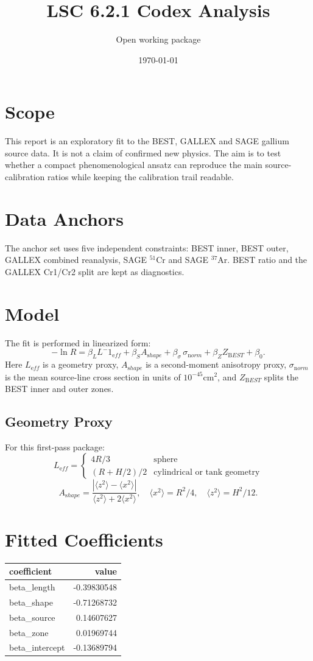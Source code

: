 \documentclass[11pt]{article}
\begin{document}
\title{LSC 6.2.1 Codex Analysis}
\author{Open working package}
\date{\today}
\maketitle

\section*{Scope}
This report is an exploratory fit to the BEST, GALLEX and SAGE gallium source data.
It is not a claim of confirmed new physics. The aim is to test whether a compact
phenomenological ansatz can reproduce the main source-calibration ratios while
keeping the calibration trail readable.

\section*{Data Anchors}
The anchor set uses five independent constraints:
BEST inner, BEST outer, GALLEX combined reanalysis, SAGE $^51$Cr and SAGE $^37$Ar.
BEST ratio and the GALLEX Cr1/Cr2 split are kept as diagnostics.

\section*{Model}
The fit is performed in linearized form:
\[
-\ln R = \beta_L L^-1_{\mathrm eff} + \beta_S A_{\mathrm shape} +
\beta_\sigma \, \sigma_{\mathrm norm} + \beta_Z Z_{\mathrm BEST} + \beta_0.
\]
Here $L_{\mathrm eff}$ is a geometry proxy, $A_{\mathrm shape}$ is a second-moment
anisotropy proxy, $\sigma_{\mathrm norm}$ is the mean source-line cross section in
units of $10^{-45}\mathrm{cm}^2$, and $Z_{\mathrm BEST}$ splits the BEST inner and
outer zones.

\subsection*{Geometry Proxy}
For this first-pass package:
\[
L_{\mathrm eff} =
\begin{cases}
4R/3 & \text{sphere} \\
(R + H/2)/2 & \text{cylindrical or tank geometry}
\end{cases}
\]
\[
A_{\mathrm shape} = \frac{\left| \langle z^2 \rangle - \langle x^2 \rangle \right|}
{\langle z^2 \rangle + 2 \langle x^2 \rangle},
\quad
\langle x^2 \rangle = R^2/4,\quad \langle z^2 \rangle = H^2/12.
\]

\section*{Fitted Coefficients}
\begin{tabular}{lr}
\toprule
coefficient & value \\
\midrule
beta\_length & -0.39830548 \\beta\_shape & -0.71268732 \\beta\_source & 0.14607627 \\beta\_zone & 0.01969744 \\beta\_intercept & -0.13689794 \\
\bottomrule
\end{tabular}
\end{document}
